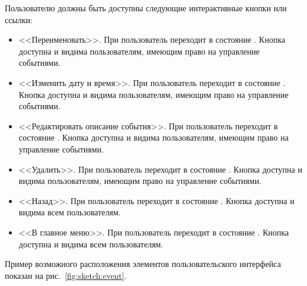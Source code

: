 \begin{enumerate}
            Пользователю должны быть доступны следующие интерактивные кнопки или ссылки:
            \begin{itemize}
                \item
                    <<Переименовать>>.
                    При  пользователь переходит в состояние
                    \hyperref[itm:req:ui:states:rename-event]
                    {}.
                    Кнопка доступна и видима пользователям, имеющим право на управление событиями.
                \item
                    <<Изменить дату и время>>.
                    При  пользователь переходит в состояние
                    \hyperref[itm:req:ui:states:edit-event-date]
                    {}.
                    Кнопка доступна и видима пользователям, имеющим право на управление событиями.
                \item
                    <<Редактировать описание события>>.
                    При  пользователь переходит в состояние
                    \hyperref[itm:req:ui:states:edit-event-desc]
                    {}.
                    Кнопка доступна и видима пользователям, имеющим право на управление событиями.
                \item
                    <<Удалить>>.
                    При  пользователь переходит в состояние
                    \hyperref[itm:req:ui:states:delete-event]
                    {}.
                    Кнопка доступна и видима пользователям, имеющим право на управление событиями.
                \item
                    <<Назад>>.
                    При  пользователь переходит в состояние
                    \hyperref[itm:req:ui:states:calendar]
                    {}.
                    Кнопка доступна и видима всем пользователям.
                \item
                    <<В главное меню>>.
                    При  пользователь переходит в состояние
                    \hyperref[itm:req:ui:states:mainmenu]
                    {}.
                    Кнопка доступна и видима всем пользователям.
            \end{itemize}

            Пример возможного расположения элементов пользовательского интерфейса показан на
            рис.~\ref{fig:sketch:event}.


\end{enumerate}
